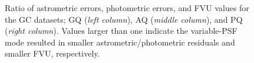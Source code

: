 \documentclass[]{spie}  %
\begin{document}
\begin{figure}[!h]
  \caption{\footnotesize Ratio of astrometric errors, photometric errors, and FVU values for the GC datasets; GQ (\textit{left column}), AQ (\textit{middle column}), and PQ (\textit{right column}). Values larger than one indicate the variable-PSF mode resulted in smaller astrometric/photometric residuals and smaller FVU, respectively.} \label{fig:gc-astrom}
\end{figure}
\end{document}
